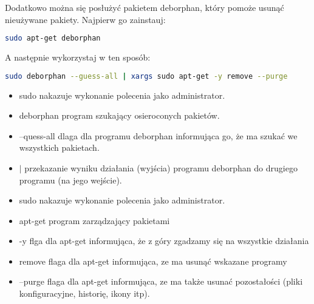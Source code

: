 Dodatkowo można się posłużyć pakietem \textcolor{ubuntu_orange}{deborphan}, który pomoże usunąć nieużywane pakiety. Najpierw go zainstauj:
\begin{lstlisting}[language=bash]
sudo apt-get deborphan
\end{lstlisting}
A następnie wykorzystaj w ten sposób:
\begin{lstlisting}[language=bash]
sudo deborphan --guess-all | xargs sudo apt-get -y remove --purge
\end{lstlisting}
\begin{itemize}
\item \textcolor{ubuntu_orange}{sudo} nakazuje wykonanie polecenia jako administrator.
\item \textcolor{ubuntu_orange}{deborphan} program szukający osieroconych pakietów.
\item \textcolor{ubuntu_orange}{--quess-all} dlaga dla programu deborphan informująca go, że ma szukać we wszystkich pakietach.
\item \textcolor{ubuntu_orange}{$\vert$} przekazanie wyniku działania (wyjścia) programu deborphan do drugiego programu (na jego wejście).
\item \textcolor{ubuntu_orange}{sudo} nakazuje wykonanie polecenia jako administrator.
\item \textcolor{ubuntu_orange}{apt-get} program zarządzający pakietami
\item \textcolor{ubuntu_orange}{-y} flga dla apt-get informująca, że z góry zgadzamy się na wszystkie działania
\item \textcolor{ubuntu_orange}{remove} flaga dla apt-get informująca, ze ma usunąć wskazane programy
\item \textcolor{ubuntu_orange}{--purge} flaga dla apt-get informująca, ze ma także usunać pozostałości (pliki konfiguracyjne, historię, ikony itp).
\end{itemize}